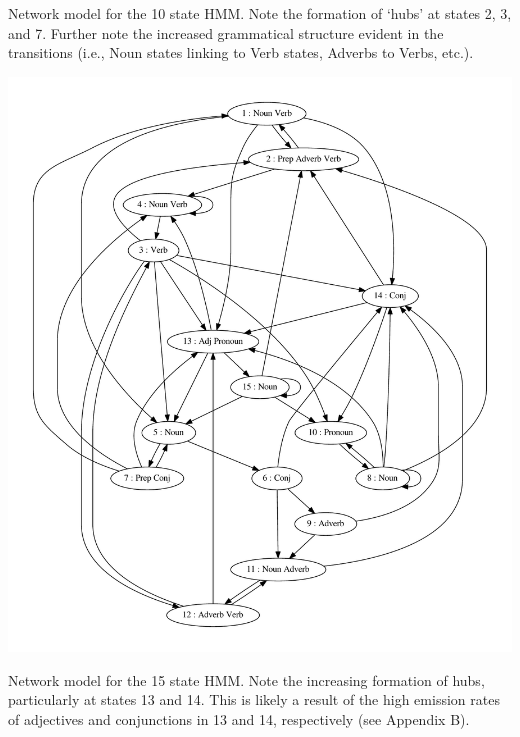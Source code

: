 Network model for the 10 state HMM. Note the formation of `hubs' at states 2, 3, and 7. Further note the increased grammatical structure evident in the transitions (i.e., Noun states linking to Verb states, Adverbs to Verbs, etc.).

\begin{center}
\includegraphics[scale=0.5]{../src/results/graph_15}
\end{center}

Network model for the 15 state HMM. Note the increasing formation of hubs, particularly at states 13 and 14. This is likely a result of the high emission rates of adjectives and conjunctions in 13 and 14, respectively (see Appendix B).


